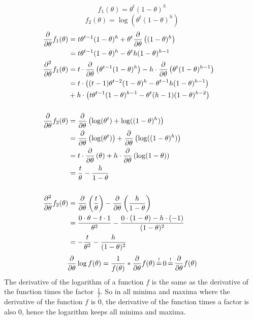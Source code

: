 %
%
\[ f_1(\theta) = \theta^t(1-\theta)^h \]
\[ f_2(\theta) = \log(\theta^t(1-\theta)^h) \]
\begin{align*}
\frac{\partial}{\partial \theta} f_1(\theta) &= t \theta^{t-1}(1-\theta)^h + \theta^t \frac{\partial}{\partial \theta}\left((1-\theta)^h\right) \\
&= t\theta^{t-1}(1-\theta)^h - \theta^t  h (1-\theta)^{h-1}
& \\
\frac{\partial^2}{\partial \theta} f_1(\theta) &= t \cdot \frac{\partial}{\partial \theta}\left(\theta^{t-1}(1-\theta)^h \right) - h \cdot \frac{\partial}{\partial \theta}\left(\theta^t (1-\theta)^{h-1}\right) \\
&= t \cdot \left((t-1)\theta^{t-2}(1-\theta)^h - \theta^{t-1}h(1-\theta)^{h-1}\right) \\
&+ h \cdot \left(t\theta^{t-1} (1-\theta)^{h-1} - \theta^t (h-1)(1-\theta)^{h-2}\right) \\
& \\
\frac{\partial}{\partial \theta} f_2(\theta) &= \frac{\partial}{\partial \theta}\left(\log(\theta^t) + \log((1-\theta)^h)\right) \\
&= \frac{\partial}{\partial \theta}\left(\log(\theta^t) \right) + \frac{\partial}{\partial \theta}\left(\log((1-\theta)^h)\right) \\
&= t \cdot \frac{\partial}{\partial \theta}\left(\theta\right) + h \cdot \frac{\partial}{\partial \theta}\left(\log(1-\theta)\right) \\
&= \frac{t}{\theta} - \frac{h}{1-\theta} \\
& \\
\frac{\partial^2}{\partial \theta} f_2(\theta) &= \frac{\partial}{\partial \theta}\left(\frac{t}{\theta}\right) - \frac{\partial}{\partial \theta}\left(\frac{h}{1-\theta}\right) \\
&= \frac{0\cdot \theta - t\cdot 1}{\theta^2} - \frac{0\cdot (1-\theta) - h \cdot (-1)}{(1-\theta)^2} \\
&= -\frac{t}{\theta^2} - \frac{h}{(1-\theta)^2}
\end{align*}
%
%
\newpage
%
%
\begin{equation*}
	\frac{\partial}{\partial \theta} \log f(\theta) = \frac{1}{f(\theta)} * \frac{\partial}{\partial \theta} f(\theta)  \operatorname*{\stackrel{!}{=}} 0 \operatorname*{\stackrel{!}{=}} \frac{\partial}{\partial \theta} f(\theta)  
\end{equation*}
The derivative of the logarithm of a function $f$ is the same as the derivative of the function times the factor~$\frac{1}{f}$. So in all minima and maxima where the derivative of the function $f$ is 0, the derivative of the function times a factor is also 0, hence the logarithm keeps all minima and maxima.

